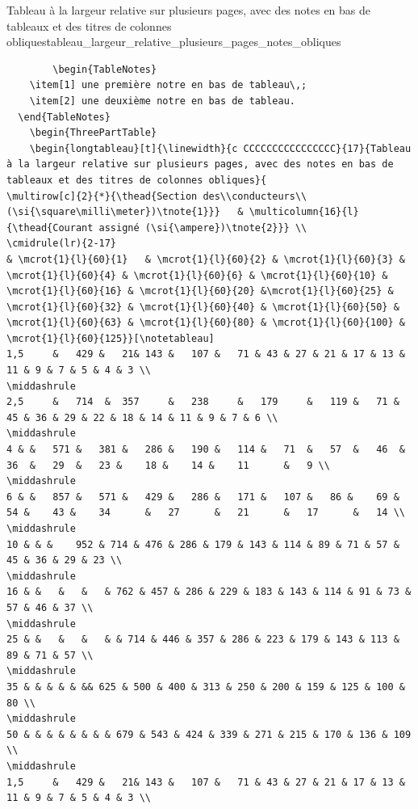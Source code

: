 \documentclass[a4paper, 11pt, twoside, fleqn]{memoir}
\begin{document}
\begin{exemple}{Tableau à la largeur relative sur plusieurs pages, avec des notes en bas de tableaux et des titres de colonnes obliques}{tableau_largeur_relative_plusieurs_pages_notes_obliques}
\begin{verbatim}
    	\begin{TableNotes}
    \item[1] une première notre en bas de tableau\,;
    \item[2] une deuxième notre en bas de tableau.
  \end{TableNotes}
    \begin{ThreePartTable}
	\begin{longtableau}[t]{\linewidth}{c CCCCCCCCCCCCCCCC}{17}{Tableau à la largeur relative sur plusieurs pages, avec des notes en bas de tableaux et des titres de colonnes obliques}{
\multirow[c]{2}{*}{\thead{Section des\\conducteurs\\(\si{\square\milli\meter})\tnote{1}}}	& \multicolumn{16}{l}{\thead{Courant assigné (\si{\ampere})\tnote{2}}} \\
\cmidrule(lr){2-17} 
& \mcrot{1}{l}{60}{1} 	& \mcrot{1}{l}{60}{2} & \mcrot{1}{l}{60}{3}	& \mcrot{1}{l}{60}{4} & \mcrot{1}{l}{60}{6} & \mcrot{1}{l}{60}{10} & \mcrot{1}{l}{60}{16} & \mcrot{1}{l}{60}{20} &\mcrot{1}{l}{60}{25} & \mcrot{1}{l}{60}{32} & \mcrot{1}{l}{60}{40} & \mcrot{1}{l}{60}{50} & \mcrot{1}{l}{60}{63} & \mcrot{1}{l}{60}{80} & \mcrot{1}{l}{60}{100} & \mcrot{1}{l}{60}{125}}[\notetableau]
1,5		&	429 &	21&	143 &	107 &	71 & 43 & 27 & 21 & 17 & 13 & 11 & 9 & 7 & 5 & 4 & 3 \\
\middashrule
2,5		&	714	 &	357		&	238		&	179		&	119	&	71 & 45 & 36 & 29 &	22 & 18 & 14 & 11 &	9 &	7 & 6 \\
\middashrule
4 & &	571 &	381 &	286 &	190	&	114	&	71	&	57	&	46	&	36	&	29	&	23 &	18 &	14 &	11		&	9 \\
\middashrule
6 & &	857 &	571 &	429 &	286	&	171	&	107	&	86 &	69 &	54 &	43 &	34		&	27		&	21		&	17		&	14 \\
\middashrule
10 & & &	952 & 714 & 476 & 286 & 179 & 143 & 114 & 89 & 71 & 57 & 45 & 36 & 29 & 23 \\
\middashrule
16 & &	 &	 &	 & 762 & 457 & 286 & 229 & 183 & 143 & 114 & 91 & 73 & 57 & 46 & 37 \\
\middashrule
25 & &	 &	 &	 & & 714 & 446 & 357 & 286 & 223 & 179 & 143 & 113 & 89 & 71 & 57 \\
\middashrule
35 & & & & & && 625 & 500 & 400 & 313 & 250 & 200 & 159 & 125 & 100 & 80 \\
\middashrule
50 & & & & & & & & 679 & 543 & 424 & 339 & 271 & 215 & 170 & 136 & 109 \\
\middashrule
1,5		&	429 &	21&	143 &	107 &	71 & 43 & 27 & 21 & 17 & 13 & 11 & 9 & 7 & 5 & 4 & 3 \\

\end{verbatim}
\end{exemple}
\end{document}
